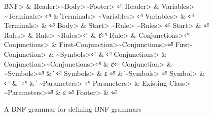 \begin{figure}[H]
  \begin{Grammar}
    \begin{aligned}
      \<BNF>                & \Derives \<Header>\~\<Body>\~\<Footer> \hfill⏎
      \<Header>             & \Derives \<Variables> \~\<Terminals> \hfill⏎
      {}                    & \| \<Terminals> \~\<Variables> \hfill⏎
      \<Variables>          & \Derives {}\hfill⏎
      \<Terminals>          & \Derives {}\hfill⏎
      \<Body>               & \Derives \<Start> \~\<Rule> \~ \<Rules> \hfill⏎
      \<Start>              & \Derives {} \hfill⏎
      \<Rules>              & \Derives \<Rule> \~\<Rules>\hfill⏎
      {}                    & \| ε\hfill⏎
      \<Rule>               & \Derives {} \<Conjunctions>\hfill⏎
      \<Conjunctions>       & \Derives \<First-Conjunction>\~\<Conjunctions>\hfill⏎
      \<First-Conjunction>  & \Derives {}\~\<Symbols>\hfill⏎
      {}                    & \| \hfill⏎
      \<Conjunctions> & \Derives \<Conjunction>\~\<Conjunctions>\hfill⏎
      {}                    & \| ε\hfill⏎
      \<Conjunction>  & \Derives {}\~\<Symbols>\hfill⏎
      {}                    & \|  \hfill⏎
      \<Symbols>    & \Derives ε \hfill⏎
      {}                    & \| \~\<Symbols> \hfill⏎
      \<Symbol>             & \Derives {} \hfill⏎
      {}                    & \|  \hfill⏎
      {}                    & \|  \~ \<Parameters> \hfill⏎
      \<Parameters>         & \Derives \cc{,} \<Existing-Class> \~ \<Parameters>\hfill⏎
      {}                    & \| ε \hfill⏎
      \<Footer>             & \Derives {}\hfill⏎
    \end{aligned}
  \end{Grammar}
  \caption{A BNF grammar for defining BNF grammars}
  \label{figure:BNF:BNF}
\end{figure}
